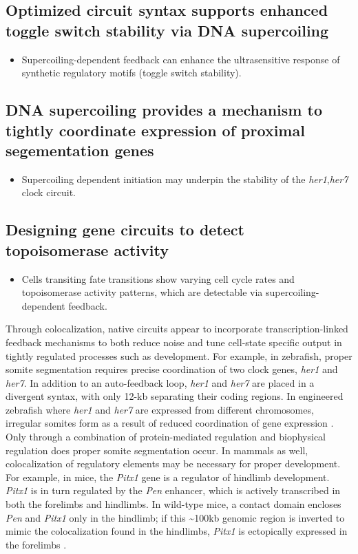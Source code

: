 \documentclass[11pt]{article}
\begin{document}
\subsection{ Optimized circuit syntax supports enhanced toggle switch stability via DNA supercoiling }
\begin{itemize}
\item Supercoiling-dependent feedback can enhance the ultrasensitive response of synthetic regulatory motifs (toggle switch stability). 
\end{itemize}

\subsection{DNA supercoiling provides a mechanism to tightly coordinate expression of proximal segementation genes }
\begin{itemize}
    \item Supercoiling dependent initiation may underpin the stability of the \textit{her1},\textit{her7} clock circuit.
  
\end{itemize}

\subsection{Designing gene circuits to detect topoisomerase activity}
\begin{itemize}

    \item Cells transiting fate transitions show varying cell cycle rates and topoisomerase activity patterns, which are detectable via supercoiling-dependent feedback.
\end{itemize}

Through colocalization, native circuits appear to incorporate transcription-linked feedback mechanisms to both reduce noise and tune cell-state specific output in tightly regulated processes such as development. For example, in zebrafish, proper somite segmentation requires precise coordination of two clock genes, \textit{her1} and \textit{her7}. In addition to an auto-feedback loop, \textit{her1} and \textit{her7} are placed in a divergent syntax, with only 12-kb separating their coding regions. In engineered zebrafish where \textit{her1} and \textit{her7} are expressed from different chromosomes, irregular somites form as a result of reduced coordination of gene expression \parencite{zinaniPairingSegmentationClock2020}. Only through a combination of protein-mediated regulation and biophysical regulation does proper somite segmentation occur. In mammals as well, colocalization of regulatory elements may be necessary for proper development. For example, in mice, the \textit{Pitx1} gene is a regulator of hindlimb development. \textit{Pitx1} is in turn regulated by the \textit{Pen} enhancer, which is actively transcribed in both the forelimbs and hindlimbs. In wild-type mice, a contact domain encloses \textit{Pen} and \textit{Pitx1} only in the hindlimb; if this  \textasciitilde{}100kb genomic region is inverted to mimic the colocalization found in the hindlimbs, \textit{Pitx1} is ectopically expressed in the forelimbs \parencite{kragesteenDynamic3DChromatin2018}.
\end{document}
